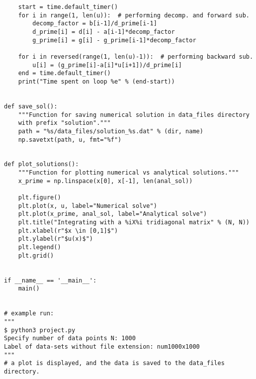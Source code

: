 \documentclass[english,notitlepage]{revtex4-1}  %
\begin{document}
\begin{lstlisting}
    start = time.default_timer()
    for i in range(1, len(u)):  # performing decomp. and forward sub.
        decomp_factor = b[i-1]/d_prime[i-1]
        d_prime[i] = d[i] - a[i-1]*decomp_factor
        g_prime[i] = g[i] - g_prime[i-1]*decomp_factor

    for i in reversed(range(1, len(u)-1)):  # performing backward sub.
        u[i] = (g_prime[i]-a[i]*u[i+1])/d_prime[i]
    end = time.default_timer()
    print("Time spent on loop %e" % (end-start))


def save_sol():
    """Function for saving numerical solution in data_files directory
    with prefix "solution"."""
    path = "%s/data_files/solution_%s.dat" % (dir, name)
    np.savetxt(path, u, fmt="%f")


def plot_solutions():
    """Function for plotting numerical vs analytical solutions."""
    x_prime = np.linspace(x[0], x[-1], len(anal_sol))

    plt.figure()
    plt.plot(x, u, label="Numerical solve")
    plt.plot(x_prime, anal_sol, label="Analytical solve")
    plt.title("Integrating with a %iX%i tridiagonal matrix" % (N, N))
    plt.xlabel(r"$x \in [0,1]$")
    plt.ylabel(r"$u(x)$")
    plt.legend()
    plt.grid()


if __name__ == '__main__':
    main()


# example run:
"""
$ python3 project.py
Specify number of data points N: 1000
Label of data-sets without file extension: num1000x1000
"""
# a plot is displayed, and the data is saved to the data_files directory.
\end{lstlisting}
\end{document}
